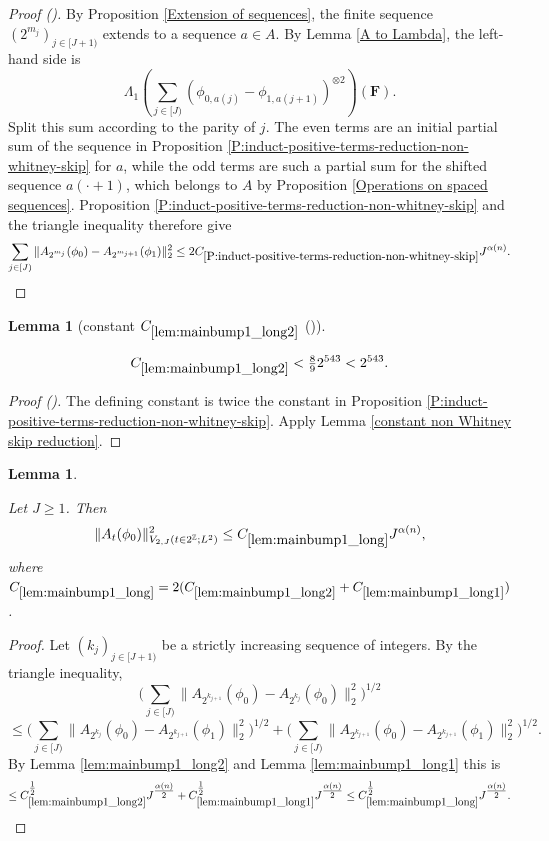 \documentclass[12pt,reqno]{amsart}
\newcommand{\auto}{{({\tiny\faCar})}}
\theoremstyle{plain}
\newtheorem{lemma}[theorem]{Lemma}
\numberwithin{equation}{section}
\theoremstyle{remark}
\newcommand{\uses}[1]{}
\newcommand{\usesdefs}[1]{}
\newcommand{\leanok}{}
\newcommand{\lean}[1]{}
\newcommand{\F}{\mathbf{F}}
\begin{document}
\begin{proof}[Proof \auto]
By Proposition \ref{Extension of sequences}, the finite sequence $(2^{m_j})_{j\in[J+1)}$ extends to a sequence $a\in A$. By Lemma \ref{A to Lambda}, the left-hand side is
\[
\Lambda_1\left(\sum_{j\in[J)}
(\phi_{0,a(j)}-\phi_{1,a(j+1)})^{\otimes2}\right)(\F).
\]
Split this sum according to the parity of $j$. The even terms are an initial partial sum of the sequence in Proposition \ref{P:induct-positive-terms-reduction-non-whitney-skip} for $a$, while the odd terms are such a partial sum for the shifted sequence $a(\cdot+1)$, which belongs to $A$ by Proposition \ref{Operations on spaced sequences}. Proposition \ref{P:induct-positive-terms-reduction-non-whitney-skip} and the triangle inequality therefore give
\[
\sum_{j\in[J)}
\|A_{2^{m_j}}(\phi_0)-A_{2^{m_{j+1}}}(\phi_1)\|_2^2
\le2C_{\ref{P:induct-positive-terms-reduction-non-whitney-skip}}J^{\alpha(n)}.
\]
\end{proof}

\begin{lemma}[constant $C_{\ref{lem:mainbump1_long2}}$ \auto]\label{constant main bump one long two}\uses{P:induct-positive-terms-reduction-non-whitney-skip,constant non Whitney skip reduction,lem:mainbump1_long2}\usesdefs{}
\lean{Auto.constantMainBumpOneLongTwo}
\leanok
\begin{equation}\label{constant main bump one long two bound}
C_{\ref{lem:mainbump1_long2}}<\tfrac89 2^{543}<2^{543}.
\end{equation}
\end{lemma}
\begin{proof}[Proof \auto]
The defining constant is twice the constant in Proposition \ref{P:induct-positive-terms-reduction-non-whitney-skip}. Apply Lemma \ref{constant non Whitney skip reduction}.
\end{proof}

\begin{lemma}\label{lem:mainbump1_long}\uses{lem:mainbump1_long2,lem:mainbump1_long1}\usesdefs{A_def,def:unipair}
\lean{Auto.mainBumpOneLong}
\leanok
Let $J\ge 1$. Then
\begin{equation}\label{mainbump1_long}
\|A_{t}(\phi_0)\|^2_{V_{2,J}(t\in 2^\mathbb{Z}; L^2)}  \le C_{\ref{lem:mainbump1_long}} J^{\alpha(n)},
\end{equation}
where $C_{\ref{lem:mainbump1_long}}=2(C_{\ref{lem:mainbump1_long2}} + C_{\ref{lem:mainbump1_long1}})$.
\end{lemma}

\begin{proof}
Let $(k_j)_{j\in [J+1)}$ be a strictly increasing sequence of integers.
By the triangle inequality,
\[ \Big(\sum_{j\in [J)} \|A_{2^{k_{j+1}}}(\phi_0)- A_{2^{k_j}}(\phi_0)\|_2^2\Big)^{1/2} \]
\[ \le \Big(\sum_{j\in [J)} \|A_{2^{k_{j}}}(\phi_0)- A_{2^{k_{j+1}}}(\phi_1)\|_2^2\Big)^{1/2}
+ \Big(\sum_{j\in [J)} \|A_{2^{k_{j+1}}}(\phi_0)- A_{2^{k_{j+1}}}(\phi_1)\|_2^2\Big)^{1/2}.
\]
By Lemma \ref{lem:mainbump1_long2} and Lemma \ref{lem:mainbump1_long1} this is
\[ \le C_{\ref{lem:mainbump1_long2}}^{\tfrac12} J^{\tfrac{\alpha(n)}{2}} + C_{\ref{lem:mainbump1_long1}}^{\tfrac12} J^{\tfrac{\alpha(n)}{2}} \le C_{\ref{lem:mainbump1_long}}^{\tfrac12} J^{\tfrac{\alpha(n)}{2}}.  \]
\end{proof}
\end{document}
